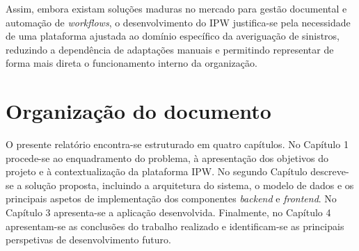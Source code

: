 Assim, embora existam soluções maduras no mercado para gestão documental e automação de \textit{workflows}, o desenvolvimento do IPW justifica-se pela necessidade de uma plataforma ajustada ao domínio específico da averiguação de sinistros, reduzindo a dependência de adaptações manuais e permitindo representar de forma mais direta o funcionamento interno da organização.

\section{Organização do documento}
O presente relatório encontra-se estruturado em quatro capítulos. No Capítulo 1 procede-se ao enquadramento do problema, à apresentação dos objetivos do projeto e à contextualização da plataforma IPW.
No segundo Capítulo descreve-se a solução proposta, incluindo a arquitetura do sistema, o modelo de dados e os principais aspetos de implementação dos componentes \textit{backend} e \textit{frontend}.
No Capítulo 3 apresenta-se a aplicação desenvolvida.
Finalmente, no Capítulo 4 apresentam-se as conclusões do trabalho realizado e identificam-se as principais perspetivas de desenvolvimento futuro.
